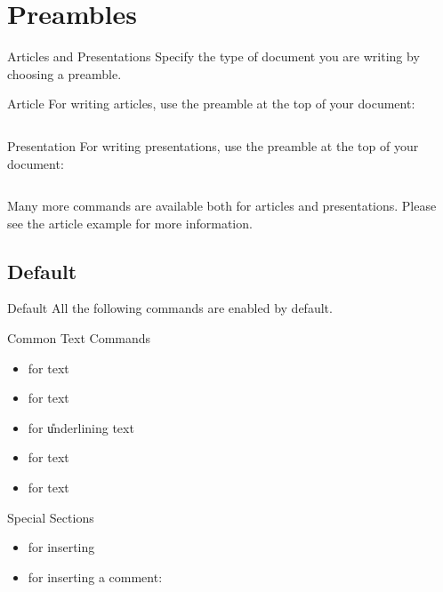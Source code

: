 \section{Preambles}
\begin{frame}[fragile]{Articles and Presentations}
  Specify the type of document you are writing by choosing a preamble.
  \begin{block}{Article}
    For writing articles, use the  preamble at the top of your document:
    \begin{lstlisting}[language=MyTex]
 \end{lstlisting}
  \end{block}
  \begin{block}{Presentation}
    For writing presentations, use the  preamble at the top of your document:
    \begin{lstlisting}[language=MyTex]
 \end{lstlisting} 
  \end{block}
  Many more commands are available both for articles and presentations. Please see the article example for more information.
\end{frame}

\iffalse

\subsection{Default}
\begin{frame}{Default}
  All the following commands are enabled by default.
  \begin{block}{Common Text Commands}
    \begin{itemize}
      \item {} for  text
      \item {} for  text
      \item {} for \U{underlining} text
      \item {} for  text
      \item {} for  text
    \end{itemize}
  \end{block}

  \begin{block}{Special Sections}
    \begin{itemize}
      \item {} for inserting \todo
      \item {} for inserting a comment: 
    \end{itemize}
  \end{block}
\end{frame}

